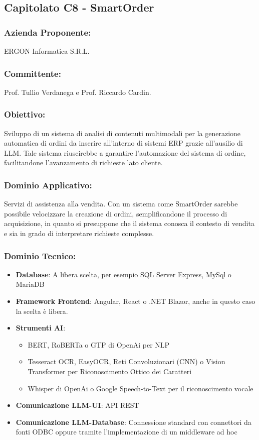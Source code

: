 \documentclass[a4paper,12pt]{article}
\begin{document}
\subsection{ Capitolato C8 - SmartOrder}
\subsubsection*{Azienda Proponente:} ERGON Informatica S.R.L.
\subsubsection*{Committente:} Prof. Tullio Verdanega e Prof. Riccardo Cardin.
\subsubsection*{Obiettivo:} Sviluppo di un sistema di analisi di contenuti multimodali per la generazione automatica di ordini da inserire all'interno di sistemi ERP grazie all'ausilio di LLM. Tale sistema riuscirebbe a garantire l'automazione del sistema di ordine, facilitandone l'avanzamento di richieste lato cliente.
\subsubsection*{Dominio Applicativo:} Servizi di assistenza alla vendita. Con un sistema come SmartOrder sarebbe possibile velocizzare la creazione di ordini, semplificandone il processo di acquisizione, in quanto si presuppone che il sistema conosca il contesto di vendita e sia in grado di interpretare richieste complesse.
\subsubsection*{Dominio Tecnico:}
\begin{itemize}
    \item \textbf{Database}: A libera scelta, per esempio SQL Server Express, MySql o MariaDB
    \item \textbf{Framework Frontend}: Angular, React o .NET Blazor, anche in questo caso la scelta è libera.
    \item \textbf{Strumenti AI}: \begin{itemize}
                            \item BERT, RoBERTa o GTP di OpenAi per NLP
                            \item Tesseract OCR, EasyOCR, Reti Convoluzionari (CNN) o Vision Transformer per Riconoscimento Ottico dei Caratteri
                            \item Whisper di OpenAi o Google Speech-to-Text per il riconoscimento vocale
                        \end{itemize}
    \item \textbf{Comunicazione LLM-UI}: API REST
    \item \textbf{Comunicazione LLM-Database}: Connessione standard con connettori da fonti ODBC oppure tramite l'implementazione di un middleware ad hoc
\end{itemize}
\end{document}
